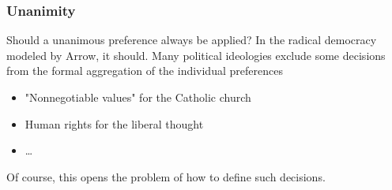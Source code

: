 \subsubsection{Unanimity}

Should a unanimous preference always be applied? In the radical democracy modeled by Arrow, it should. Many political ideologies exclude some decisions from the formal aggregation of the individual preferences
\begin{itemize}
	\item "Nonnegotiable values" for the Catholic church
	
	\item Human rights for the liberal thought
	
	\item \dots
\end{itemize}

Of course, this opens the problem of how to define such decisions.

